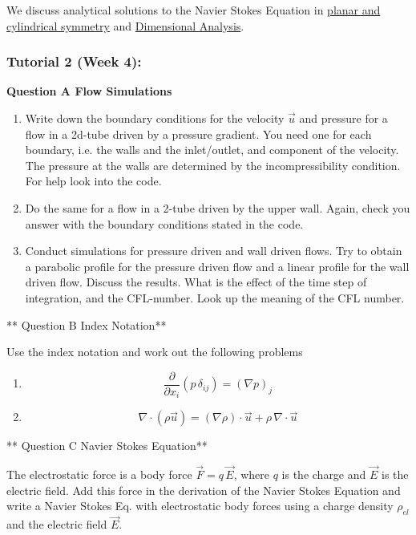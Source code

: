 \documentclass[11pt]{article}
\providecommand{\tightlist}{%
      \setlength{\itemsep}{0pt}\setlength{\parskip}{0pt}}
\begin{document}
We discuss analytical solutions to the Navier Stokes Equation in
\href{Analytical\%20solutions\%20to\%20steady\%20and\%20laminar\%20flows.ipynb}{planar
and cylindrical symmetry} and
\href{Dimensional\%20Analysis\%20of\%20the\%20Navier\%20Stokes\%20Equation.ipynb}{Dimensional
Analysis}.

\subsubsection{Tutorial 2 (Week 4):}\label{tutorial-2-week-4}

\textbf{Question A Flow Simulations}

\begin{enumerate}
\def\labelenumi{\arabic{enumi}.}
\tightlist
\item
  Write down the boundary conditions for the velocity \(\vec{u}\) and
  pressure for a flow in a 2d-tube driven by a pressure gradient. You
  need one for each boundary, i.e. the walls and the inlet/outlet, and
  component of the velocity. The pressure at the walls are determined by
  the incompressibility condition. For help look into the code.
\item
  Do the same for a flow in a 2-tube driven by the upper wall. Again,
  check you answer with the boundary conditions stated in the code.
\item
  Conduct simulations for pressure driven and wall driven flows. Try to
  obtain a parabolic profile for the pressure driven flow and a linear
  profile for the wall driven flow. Discuss the results. What is the
  effect of the time step of integration, and the CFL-number. Look up
  the meaning of the CFL number.
\end{enumerate}

** Question B Index Notation**

Use the index notation and work out the following problems

\begin{enumerate}
\def\labelenumi{\arabic{enumi}.}
\tightlist
\item
  \[\frac{\partial}{\partial x_i}(p\,\delta_{ij})=(\nabla p)_j\]
\item
  \[\nabla\cdot(\rho \vec{u})=(\nabla \rho)\cdot \vec{u}+\rho\,\nabla\cdot\vec{u}\]
\end{enumerate}

** Question C Navier Stokes Equation**

The electrostatic force is a body force \(\vec{F}=q\,\vec{E}\), where
\(q\) is the charge and \(\vec{E}\) is the electric field. Add this
force in the derivation of the Navier Stokes Equation and write a Navier
Stokes Eq. with electrostatic body forces using a charge density
\(\rho_{el}\) and the electric field \(\vec{E}\).
\end{document}
